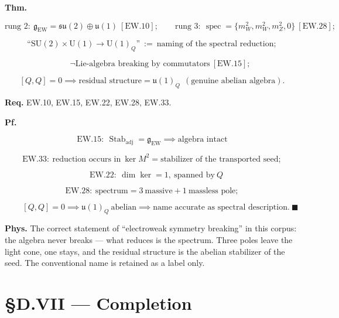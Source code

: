 \begin{theorem}\label{tag:EW-30}
\textbf{Thm.}

\[
\text{rung 2}:\ \mathfrak g_{\mathrm{EW}}=\mathfrak{su}(2)\oplus\mathfrak u(1)\ [\mathrm{EW.10}];\qquad
\text{rung 3}:\ \operatorname{spec}=\{m_W^2,m_W^2,m_Z^2,0\}\ [\mathrm{EW.28}];
\]

\[
\text{“}\mathrm{SU}(2)\times\mathrm{U}(1)\to\mathrm{U}(1)_Q\text{”}\ :=\ \text{naming of the spectral reduction};
\]

\[
\qquad \neg\text{Lie-algebra breaking by commutators}\ [\mathrm{EW.15}];
\]

\[
[Q,Q]=0\implies\text{residual structure}=\mathfrak u(1)_Q\ \ (\text{genuine abelian algebra}).
\]

\textbf{Req.} EW.10, EW.15, EW.22, EW.28, EW.33.

\textbf{Pf.}

\[
\mathrm{EW.15}:\ \operatorname{Stab}_{\mathrm{adj}}=\mathfrak g_{\mathrm{EW}}\implies\text{algebra intact}
\]

\[
\mathrm{EW.33}:\ \text{reduction occurs in}\ \ker M^2=\text{stabilizer of the transported seed};
\]

\[
\quad \mathrm{EW.22}:\ \dim\ker=1,\ \text{spanned by}\ Q
\]

\[
\mathrm{EW.28}:\ \text{spectrum}=3\ \text{massive}+1\ \text{massless pole};
\]

\[
\qquad [Q,Q]=0\implies\mathfrak u(1)_Q\ \text{abelian}\implies\text{name accurate as spectral description}.\ \blacksquare
\]

\textbf{Phys.} The correct statement of “electroweak symmetry breaking” in this corpus: the algebra never breaks — what reduces is the spectrum. Three poles leave the light cone, one stays, and the residual structure is the abelian stabilizer of the seed. The conventional name is retained as a label only.

\end{theorem}

\section[§D.VII — Completion]{\texorpdfstring{§D.VII — Completion}{SD.VII - Completion}}

